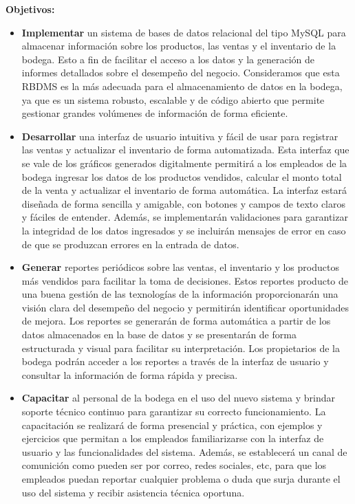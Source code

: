 \documentclass{article}
\begin{document}
  \textbf{Objetivos:}
    \begin{itemize}

      \item \textbf{Implementar} un sistema de bases de datos relacional del tipo MySQL para almacenar información sobre los productos, las ventas y el inventario de la bodega. Esto a fin de facilitar el acceso a los datos y la generación de informes detallados sobre el desempeño del negocio. Consideramos que esta RBDMS es la más adecuada para el almacenamiento de datos en la bodega, ya que es un sistema robusto, escalable y de código abierto que permite gestionar grandes volúmenes de información de forma eficiente.
      
      \item \textbf{Desarrollar} una interfaz de usuario intuitiva y fácil de usar para registrar las ventas y actualizar el inventario de forma automatizada. Esta interfaz que se vale de los gráficos generados digitalmente permitirá a los empleados de la bodega ingresar los datos de los productos vendidos, calcular el monto total de la venta y actualizar el inventario de forma automática. La interfaz estará diseñada de forma sencilla y amigable, con botones y campos de texto claros y fáciles de entender. Además, se implementarán validaciones para garantizar la integridad de los datos ingresados y se incluirán mensajes de error en caso de que se produzcan errores en la entrada de datos.
      
      
      \item \textbf{Generar} reportes periódicos sobre las ventas, el inventario y los productos más vendidos para facilitar la toma de decisiones. Estos reportes producto de una buena gestión de las texnologías de la información proporcionarán una visión clara del desempeño del negocio y permitirán identificar oportunidades de mejora. Los reportes se generarán de forma automática a partir de los datos almacenados en la base de datos y se presentarán de forma estructurada y visual para facilitar su interpretación. Los propietarios de la bodega podrán acceder a los reportes a través de la interfaz de usuario y consultar la información de forma rápida y precisa.
      

      \item \textbf{Capacitar} al personal de la bodega en el uso del nuevo sistema y brindar soporte técnico continuo para garantizar su correcto funcionamiento. La capacitación se realizará de forma presencial y práctica, con ejemplos y ejercicios que permitan a los empleados familiarizarse con la interfaz de usuario y las funcionalidades del sistema. Además, se establecerá un canal de comunición como pueden ser por correo, redes sociales, etc, para que los empleados puedan reportar cualquier problema o duda que surja durante el uso del sistema y recibir asistencia técnica oportuna.
      

\end{itemize}
\end{document}
